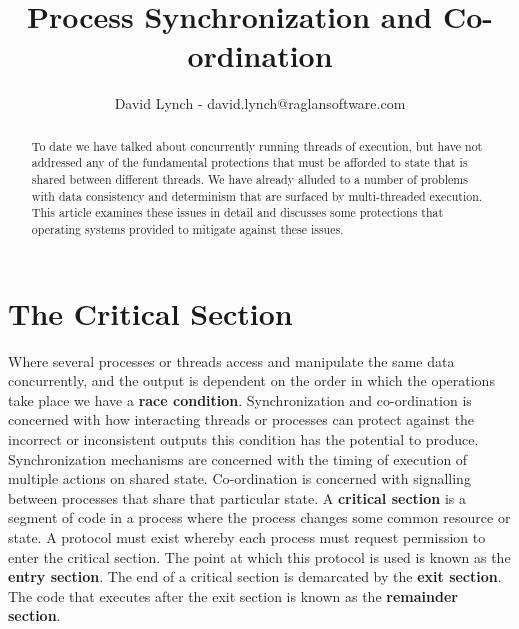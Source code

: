 \documentclass[10pt,a4paper]{article}
\title{Process Synchronization and Co-ordination}
\author{David Lynch - david.lynch@raglansoftware.com }
\begin{document}
\maketitle
\begin{abstract}
To date we have talked about concurrently running threads of execution, but have not addressed any of the fundamental protections that must be afforded to state that is shared between different threads. We have already alluded to a number of problems with data consistency and determinism that are surfaced by multi-threaded execution. This article examines these issues in detail and discusses some protections that operating systems provided to mitigate against these issues.
\end{abstract}
\section{The Critical Section}
Where several processes or threads access and manipulate the same data concurrently, and the output is dependent on the order in which the operations take place we have a {\bf race condition}. Synchronization and co-ordination is concerned with how interacting threads or processes can protect against the incorrect or inconsistent outputs this condition has the potential to produce. Synchronization mechanisms are concerned with the timing of execution of multiple actions on shared state. Co-ordination is concerned with signalling between processes that share that particular state. A {\bf critical section} is a segment of code in a process where the process changes some common resource or state. A protocol must exist whereby each process must request permission to enter the critical section. The point at which this protocol is used is known as the {\bf entry section}. The end of a critical section is demarcated by the {\bf exit section}. The code that executes after the exit section is known as the {\bf remainder section}.
\end{document}
